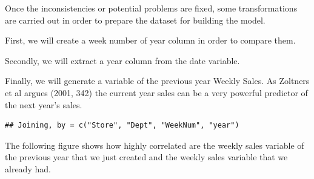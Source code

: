 \documentclass[11pt,]{article}
\newenvironment{Shaded}{\begin{snugshade}}{\end{snugshade}}
\newcommand{\KeywordTok}[1]{\textcolor[rgb]{0.13,0.29,0.53}{\textbf{{#1}}}}
\newcommand{\DataTypeTok}[1]{\textcolor[rgb]{0.13,0.29,0.53}{{#1}}}
\newcommand{\DecValTok}[1]{\textcolor[rgb]{0.00,0.00,0.81}{{#1}}}
\newcommand{\StringTok}[1]{\textcolor[rgb]{0.31,0.60,0.02}{{#1}}}
\newcommand{\CommentTok}[1]{\textcolor[rgb]{0.56,0.35,0.01}{\textit{{#1}}}}
\newcommand{\NormalTok}[1]{{#1}}
\begin{document}
Once the inconsistencies or potential problems are fixed, some
transformations are carried out in order to prepare the dataset for
building the model.

First, we will create a week number of year column in order to compare
them.

\begin{Shaded}
\end{Shaded}

Secondly, we will extract a year column from the date variable.

\begin{Shaded}
\end{Shaded}

Finally, we will generate a variable of the previous year Weekly Sales.
As Zoltners et al argues (2001, 342) the current year sales can be a
very powerful predictor of the next year's sales.

\begin{Shaded}
\end{Shaded}

\begin{verbatim}
## Joining, by = c("Store", "Dept", "WeekNum", "year")
\end{verbatim}

The following figure shows how highly correlated are the weekly sales
variable of the previous year that we just created and the weekly sales
variable that we already had.
\end{document}
